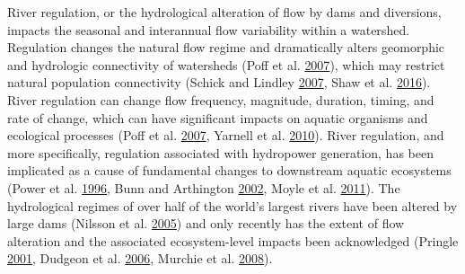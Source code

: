 \documentclass[twoside,12pt,final]{ucthesis-CA2012} %
\begin{document}
\begin{ucmainmatter}
River regulation, or the hydrological alteration of flow by dams and
diversions, impacts the seasonal and interannual flow variability within
a watershed. Regulation changes the natural flow regime and dramatically
alters geomorphic and hydrologic connectivity of watersheds (Poff et al.
\protect\hyperlink{ref-poff_homogenization_2007}{2007}), which may
restrict natural population connectivity (Schick and Lindley
\protect\hyperlink{ref-schick_directed_2007}{2007}, Shaw et al.
\protect\hyperlink{ref-shaw_importance_2016}{2016}). River regulation
can change flow frequency, magnitude, duration, timing, and rate of
change, which can have significant impacts on aquatic organisms and
ecological processes (Poff et al.
\protect\hyperlink{ref-poff_homogenization_2007}{2007}, Yarnell et al.
\protect\hyperlink{ref-yarnell_ecology_2010}{2010}). River regulation,
and more specifically, regulation associated with hydropower generation,
has been implicated as a cause of fundamental changes to downstream
aquatic ecosystems (Power et al.
\protect\hyperlink{ref-power_dams_1996}{1996}, Bunn and Arthington
\protect\hyperlink{ref-bunn_basic_2002}{2002}, Moyle et al.
\protect\hyperlink{ref-moyle_rapid_2011}{2011}). The hydrological
regimes of over half of the world's largest rivers have been altered by
large dams (Nilsson et al.
\protect\hyperlink{ref-nilsson_fragmentation_2005}{2005}) and only
recently has the extent of flow alteration and the associated
ecosystem-level impacts been acknowledged (Pringle
\protect\hyperlink{ref-pringle_hydrologic_2001}{2001}, Dudgeon et al.
\protect\hyperlink{ref-dudgeon_freshwater_2006}{2006}, Murchie et al.
\protect\hyperlink{ref-murchie_fish_2008}{2008}).


\end{ucmainmatter}
\end{document}
